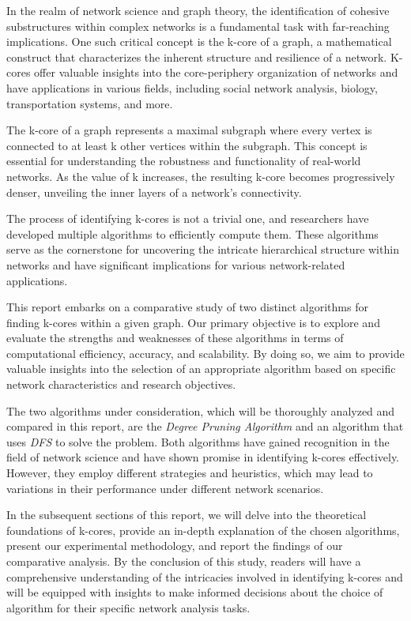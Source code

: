 \label{sec:Introduction}

In the realm of network science and graph theory, the identification of cohesive substructures within complex networks is a fundamental task with far-reaching implications. One such critical concept is the k-core of a graph, a mathematical construct that characterizes the inherent structure and resilience of a network. K-cores offer valuable insights into the core-periphery organization of networks and have applications in various fields, including social network analysis, biology, transportation systems, and more.

The k-core of a graph represents a maximal subgraph where every vertex is connected to at least k other vertices within the subgraph. This concept is essential for understanding the robustness and functionality of real-world networks. As the value of k increases, the resulting k-core becomes progressively denser, unveiling the inner layers of a network's connectivity.

The process of identifying k-cores is not a trivial one, and researchers have developed multiple algorithms to efficiently compute them. These algorithms serve as the cornerstone for uncovering the intricate hierarchical structure within networks and have significant implications for various network-related applications.

This report embarks on a comparative study of two distinct algorithms for finding k-cores within a given graph. Our primary objective is to explore and evaluate the strengths and weaknesses of these algorithms in terms of computational efficiency, accuracy, and scalability. By doing so, we aim to provide valuable insights into the selection of an appropriate algorithm based on specific network characteristics and research objectives.

The two algorithms under consideration, which will be thoroughly analyzed and compared in this report, are the \textit{Degree Pruning Algorithm} and an algorithm that uses \textit{DFS} to solve the problem. Both algorithms have gained recognition in the field of network science and have shown promise in identifying k-cores effectively. However, they employ different strategies and heuristics, which may lead to variations in their performance under different network scenarios.

In the subsequent sections of this report, we will delve into the theoretical foundations of k-cores, provide an in-depth explanation of the chosen algorithms, present our experimental methodology, and report the findings of our comparative analysis. By the conclusion of this study, readers will have a comprehensive understanding of the intricacies involved in identifying k-cores and will be equipped with insights to make informed decisions about the choice of algorithm for their specific network analysis tasks.

